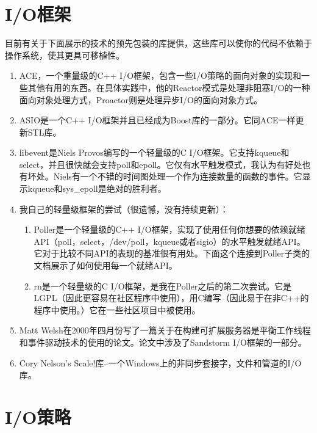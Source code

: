 \documentclass[twoside, xetex]{report}
\begin{document}
\section*{I/O框架}
	目前有关于下面展示的技术的预先包装的库提供，这些库可以使你的代码不依赖于操作系统，使其更具可移植性。
	\begin{enumerate}
	
	\item ACE，一个重量级的C++ I/O框架，包含一些I/O策略的面向对象的实现和一些其他有用的东西。在具体实践中，他的Reactor模式是处理非阻塞I/O的一种面向对象处理方式，Proactor则是处理异步I/O的面向对象方式。
	\item ASIO是一个C++ I/O框架并且已经成为Boost库的一部分。它同ACE一样更新STL库。
	\item libevent是Niels Provos编写的一个轻量级的C I/O框架。它支持kqueue和select，并且很快就会支持poll和epoll。它仅有水平触发模式，我认为有好处也有坏处。Niels有一个不错的时间图处理一个作为连接数量的函数的事件。它显示kqueue和sys\_epoll是绝对的胜利者。
	\item 我自己的轻量级框架的尝试（很遗憾，没有持续更新）：
		\begin{enumerate}
		\item Poller是一个轻量级的C++ I/O框架，实现了使用任何你想要的依赖就绪API（poll，select，/dev/poll，kqueue或者sigio）的水平触发就绪API。它对于比较不同API的表现的基准很有用处。下面这个连接到Poller子类的文档展示了如何使用每一个就绪API。
		\item rn是一个轻量级的C I/O框架，是我在Poller之后的第二次尝试。它是LGPL（因此更容易在社区程序中使用），用C编写（因此易于在非C++的程序中使用。）它在一些社区项目中被使用。
		\end{enumerate}
	\item Matt Welsh在2000年四月份写了一篇关于在构建可扩展服务器是平衡工作线程和事件驱动技术的使用的论文。论文中涉及了Sandstorm I/O框架的一部分。
	\item Cory Nelson's Scale!库--一个Windows上的非同步套接字，文件和管道的I/O库。
	\end{enumerate}
	
\section*{I/O策略}
\end{document}

